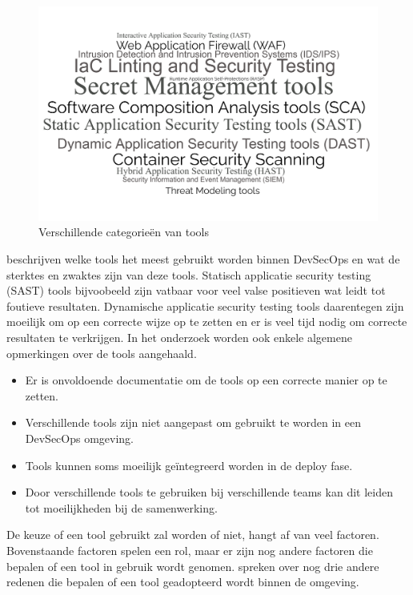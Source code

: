 \begin{figure}[H]
  \centering
  \includegraphics[scale=0.12]{graphics/wordcloud.png}
  \caption{\label{fig:wordcloud}Verschillende categorieën van tools \autocite{Martelleur2022}}
\end{figure}
\clearpage

\textcite{Martelleur2022} beschrijven welke tools het meest gebruikt worden binnen DevSecOps en wat de sterktes en zwaktes zijn van deze tools. Statisch applicatie security testing (SAST) tools bijvoobeeld zijn vatbaar voor veel valse positieven wat leidt tot foutieve resultaten. Dynamische applicatie security testing tools daarentegen zijn moeilijk om op een correcte wijze op te zetten en er is veel tijd nodig om correcte resultaten te verkrijgen. In het onderzoek worden ook enkele algemene opmerkingen over de tools aangehaald.


\begin{itemize}
  \item Er is onvoldoende documentatie om de tools op een correcte manier op te zetten.
  \item Verschillende tools zijn niet aangepast om gebruikt te worden in een DevSecOps omgeving.
  \item Tools kunnen soms moeilijk geïntegreerd worden in de deploy fase.
  \item Door verschillende tools te gebruiken bij verschillende teams kan dit leiden tot moeilijkheden bij de samenwerking.
\end{itemize}
  
De keuze of een tool gebruikt zal worden of niet, hangt af van veel factoren. Bovenstaande factoren spelen een rol, maar er zijn nog andere factoren die bepalen of een tool in gebruik wordt genomen. \textcite{Rajapakse2022} spreken over nog drie andere redenen die bepalen of een tool geadopteerd wordt binnen de omgeving.

